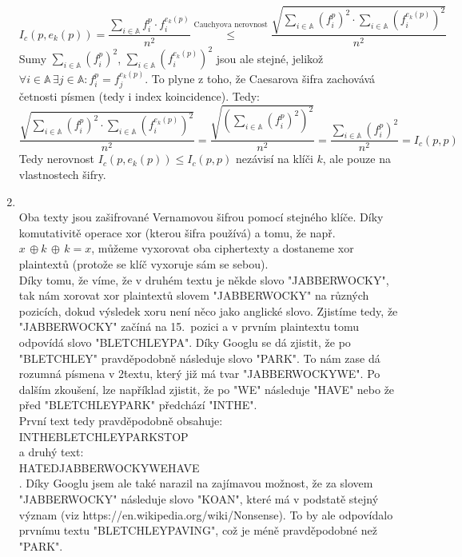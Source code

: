 \documentclass[12pt]{article}
\begin{document}
\begin{enumerate}
		\[
		I_c(p,e_k(p)) = \frac{\sum\limits_{i\in \mathbb{A}} f_i^p \cdot f_i^{e_k(p)}}{n^2} \stackrel{\text{Cauchyova nerovnost}}{\leq} \frac{\sqrt{\sum\limits_{i\in \mathbb{A}} (f_i^p)^2 \cdot \sum\limits_{i\in \mathbb{A}} (f_i^{e_k(p)})^2}}{n^2}
		\]
		Sumy $\sum\limits_{i\in \mathbb{A}} (f_i^p)^2$, $\sum\limits_{i\in \mathbb{A}} (f_i^{e_k(p)})^2$ jsou ale stejné, jelikož $\forall i \in \mathbb{A} \, \exists j \in \mathbb{A} : f_i^p = f_j^{e_k(p)}$. To plyne z toho, že Caesarova šifra zachovává četnosti písmen (tedy i index koincidence). Tedy:
		\[
		\frac{\sqrt{\sum\limits_{i\in \mathbb{A}} (f_i^p)^2 \cdot \sum\limits_{i\in \mathbb{A}} (f_i^{e_k(p)})^2}}{n^2} = \frac{\sqrt{(\sum\limits_{i\in \mathbb{A}} (f_i^p)^2)^2}}{n^2} = \frac{\sum\limits_{i\in \mathbb{A}} (f_i^p)^2}{n^2} = I_c(p,p)
		\]
		Tedy nerovnost $I_c(p,e_k(p)) \leq I_c(p,p)$ nezávisí na klíči $k$, ale pouze na vlastnostech šifry.
		\item \quad\\
		Oba texty jsou zašifrované Vernamovou šifrou pomocí stejného klíče. Díky komutativitě operace xor (kterou šifra používá) a tomu, že např. $x \, \oplus k \, \oplus \, k = x$,  můžeme vyxorovat oba ciphertexty a dostaneme xor plaintextů (protože se klíč vyxoruje sám se sebou).\\
		Díky tomu, že víme, že v druhém textu je někde slovo "JABBERWOCKY", tak nám xorovat xor plaintextů slovem "JABBERWOCKY" na různých pozicích, dokud výsledek xoru není něco jako anglické slovo. Zjistíme tedy, že "JABBERWOCKY" začíná na 15.\ pozici a v prvním plaintextu tomu odpovídá slovo "BLETCHLEYPA". Díky Googlu se dá zjistit, že po "BLETCHLEY" pravděpodobně následuje slovo "PARK". To nám zase dá rozumná písmena v 2\. textu, který již má tvar "JABBERWOCKYWE". Po dalším zkoušení, lze například zjistit, že po "WE" následuje "HAVE" nebo že před "BLETCHLEYPARK" předchází "INTHE".\\
		První text tedy pravděpodobně obsahuje:\\
		INTHEBLETCHLEYPARKSTOP\\
		a druhý text:\\
		HATEDJABBERWOCKYWEHAVE\\.
		Díky Googlu jsem ale také narazil na zajímavou možnost, že za slovem "JABBERWOCKY" následuje slovo "KOAN", které má v podstatě stejný význam (viz https://en.wikipedia.org/wiki/Nonsense). To by ale odpovídalo prvnímu textu "BLETCHLEYPAVING", což je méně pravděpodobné než "PARK".
		
	\end{enumerate}
\end{document}
